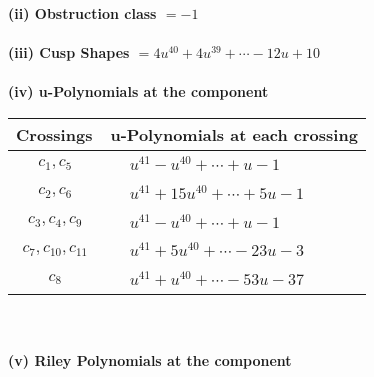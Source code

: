 \documentclass[1p]{elsarticle_modified}
\theoremstyle{definition}
\begin{document}
\flushleft \textbf{(ii) Obstruction class $= -1$}\\~\\
\flushleft \textbf{(iii) Cusp Shapes $= 4 u^{40}+4 u^{39}+\cdots-12 u+10$}\\~\\
\newpage\renewcommand{\arraystretch}{1}
\flushleft \textbf{(iv) u-Polynomials at the component}\newline \\
\begin{tabular}{m{50pt}|m{274pt}}
Crossings & \hspace{64pt}u-Polynomials at each crossing \\
\hline $$\begin{aligned}c_{1},c_{5}\end{aligned}$$&$\begin{aligned}
&u^{41}- u^{40}+\cdots+u-1
\end{aligned}$\\
\hline $$\begin{aligned}c_{2},c_{6}\end{aligned}$$&$\begin{aligned}
&u^{41}+15 u^{40}+\cdots+5 u-1
\end{aligned}$\\
\hline $$\begin{aligned}c_{3},c_{4},c_{9}\end{aligned}$$&$\begin{aligned}
&u^{41}- u^{40}+\cdots+u-1
\end{aligned}$\\
\hline $$\begin{aligned}c_{7},c_{10},c_{11}\end{aligned}$$&$\begin{aligned}
&u^{41}+5 u^{40}+\cdots-23 u-3
\end{aligned}$\\
\hline $$\begin{aligned}c_{8}\end{aligned}$$&$\begin{aligned}
&u^{41}+u^{40}+\cdots-53 u-37
\end{aligned}$\\
\hline
\end{tabular}\\~\\
\newpage\renewcommand{\arraystretch}{1}
\flushleft \textbf{(v) Riley Polynomials at the component}\newline \\
\end{document}
